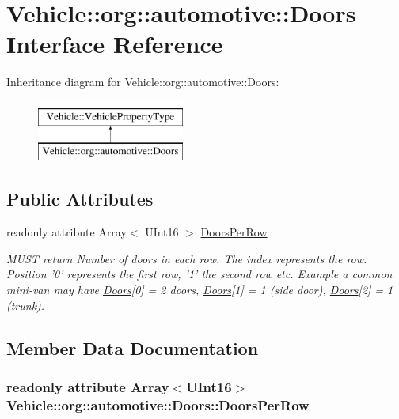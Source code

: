 \hypertarget{interfaceVehicle_1_1org_1_1automotive_1_1Doors}{\section{Vehicle\-:\-:org\-:\-:automotive\-:\-:Doors Interface Reference}
\label{interfaceVehicle_1_1org_1_1automotive_1_1Doors}
}
Inheritance diagram for Vehicle\-:\-:org\-:\-:automotive\-:\-:Doors\-:\begin{figure}[H]
\begin{center}
\leavevmode
\includegraphics[height=2.000000cm]{interfaceVehicle_1_1org_1_1automotive_1_1Doors}
\end{center}
\end{figure}
\subsection*{Public Attributes}
\begin{DoxyCompactItemize}
\item 
readonly attribute Array$<$ U\-Int16 $>$ \hyperlink{interfaceVehicle_1_1org_1_1automotive_1_1Doors_acc6ffbada5373d996fc2a99de1b3ce90}{Doors\-Per\-Row}
\begin{DoxyCompactList}\small\item\em M\-U\-S\-T return Number of doors in each row. The index represents the row. Position '0' represents the first row, '1' the second row etc. Example a common mini-\/van may have \hyperlink{interfaceVehicle_1_1org_1_1automotive_1_1Doors}{Doors}\mbox{[}0\mbox{]} = 2 doors, \hyperlink{interfaceVehicle_1_1org_1_1automotive_1_1Doors}{Doors}\mbox{[}1\mbox{]} = 1 (side door), \hyperlink{interfaceVehicle_1_1org_1_1automotive_1_1Doors}{Doors}\mbox{[}2\mbox{]} = 1 (trunk). \end{DoxyCompactList}\end{DoxyCompactItemize}


\subsection{Member Data Documentation}
\hypertarget{interfaceVehicle_1_1org_1_1automotive_1_1Doors_acc6ffbada5373d996fc2a99de1b3ce90}{
\subsubsection[{Doors\-Per\-Row}]{\setlength{\rightskip}{0pt plus 5cm}readonly attribute Array$<$U\-Int16$>$ Vehicle\-::org\-::automotive\-::\-Doors\-::\-Doors\-Per\-Row}}\label{interfaceVehicle_1_1org_1_1automotive_1_1Doors_acc6ffbada5373d996fc2a99de1b3ce90}


